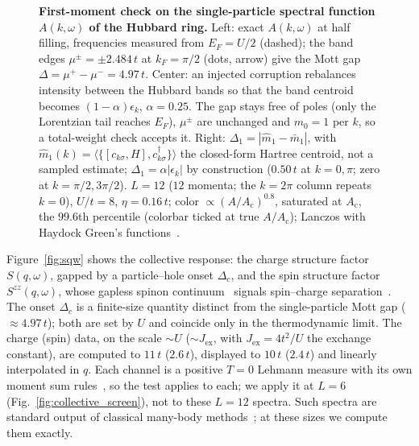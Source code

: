 \documentclass[submission, PhysCore]{SciPost}
\begin{document}
\begin{appendix}
\begin{figure}[t]
\centering
{}
\caption{\textbf{First-moment check on the single-particle spectral function $A(k,\omega)$ of the Hubbard ring.} Left: exact $A(k,\omega)$ at half filling, frequencies measured from $E_F=U/2$ (dashed); the band edges $\mu^\pm=\pm2.484\,t$ at $k_F=\pi/2$ (dots, arrow) give the Mott gap $\Delta=\mu^+-\mu^-=4.97\,t$. Center: an injected corruption rebalances intensity between the Hubbard bands so that the band centroid becomes $(1-\alpha)\epsilon_k$, $\alpha=0.25$. The gap stays free of poles (only the Lorentzian tail reaches $E_F$), $\mu^\pm$ are unchanged and $m_0=1$ per $k$, so a total-weight check accepts it. Right: $\Delta_1=|\widehat m_1-\bar m_1|$, with ${\widehat m_1(k)=\langle\{[c_{k\sigma},H],c_{k\sigma}^\dagger\}\rangle}$ the closed-form Hartree centroid, not a sampled estimate; $\Delta_1=\alpha|\epsilon_k|$ by construction ($0.50\,t$ at $k=0,\pi$; zero at $k=\pi/2,3\pi/2$). $L=12$ ($12$ momenta; the $k=2\pi$ column repeats $k=0$), $U/t=8$, $\eta=0.16\,t$; color $\propto(A/A_{\mathrm c})^{0.8}$, saturated at $A_{\mathrm c}$, the $99.6$th percentile (colorbar ticked at true $A/A_{\mathrm c}$); Lanczos with Haydock Green's functions~\cite{Haydock1972,Lanczos1950}.}
\label{fig:akw}
\end{figure}

Figure~\ref{fig:sqw} shows the collective response: the charge structure factor $S(q,\omega)$, gapped by a particle--hole onset $\Delta_c$, and the spin structure factor $S^{zz}(q,\omega)$, whose gapless spinon continuum~\cite{Voit1995} signals spin--charge separation~\cite{Benthien2004}. The onset $\Delta_c$ is a finite-size quantity distinct from the single-particle Mott gap ($\approx4.97\,t$); both are set by $U$ and coincide only in the thermodynamic limit. The charge (spin) data, on the scale $\sim U$ ($\sim J_{\mathrm{ex}}$, with $J_{\mathrm{ex}}=4t^2/U$ the exchange constant), are computed to $11\,t$ ($2.6\,t$), displayed to $10\,t$ ($2.4\,t$) and linearly interpolated in $q$. Each channel is a positive $T=0$ Lehmann measure with its own moment sum rules~\cite{HohenbergMartin1965}, so the test applies to each; we apply it at $L=6$ (Fig.~\ref{fig:collective_screen}), not to these $L=12$ spectra. Such spectra are standard output of classical many-body methods~\cite{KuhnerWhite1999,Jeckelmann2002,Schollwock2011,Georges1996,Gull2011,Jarrell1996}; at these sizes we compute them exactly.


\end{appendix}
\end{document}
